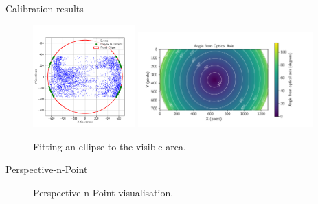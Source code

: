 \documentclass{beamer}
\begin{document}
\begin{frame}{Calibration results}
   
   \begin{figure}[H]
	\centering
	  \includegraphics[width=0.35\textwidth]{./fig/pgfplot/build/ellipse_hull.pdf}
	  \includegraphics[width=0.6\textwidth]{./fig/pgfplot/build/evk4_viz.pdf}

	\caption{Fitting an ellipse to the visible area.}
	\label{fig:calib2}
    \end{figure}
    
\end{frame}

\begin{frame}{Perspective-n-Point}

\begin{figure}[H]
    \centering
    \hspace{1em}%
    \label{fig:pnp}
    \caption{Perspective-n-Point visualisation.}
\end{figure}

\end{frame}
\end{document}
